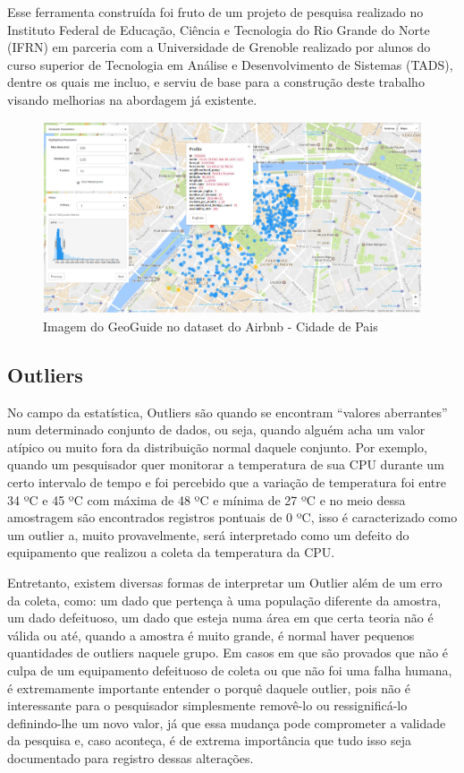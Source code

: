 Esse ferramenta construída foi fruto de um projeto de pesquisa realizado no Instituto Federal de Educação, Ciência e Tecnologia do Rio Grande do Norte (IFRN) em parceria com a Universidade de Grenoble realizado por alunos do curso superior de Tecnologia em Análise e Desenvolvimento de Sistemas (TADS), dentre os quais me incluo, e serviu de base para a construção deste trabalho visando melhorias na abordagem já existente.

\begin{figure}[t]
	\centering
	\includegraphics[width=\textwidth]{images/geoguide-example-airbnb}
	\caption{Imagem do GeoGuide no dataset do Airbnb - Cidade de Pais}
	\label{fig:geoguide-example-airbnb}
	\vspace{-10pt}
\end{figure}

\subsection{Outliers}

No campo da estatística, Outliers são quando se encontram ``valores aberrantes'' num determinado conjunto de dados, ou seja, quando alguém acha um valor atípico ou muito fora da distribuição normal daquele conjunto. Por exemplo, quando um pesquisador quer monitorar a temperatura de sua CPU durante um certo intervalo de tempo e foi percebido que a variação de temperatura foi entre 34 ºC e 45 ºC com máxima de 48 ºC e mínima de 27 ºC e no meio dessa amostragem são encontrados registros pontuais de 0 ºC, isso é caracterizado como um outlier a, muito provavelmente, será interpretado como um defeito do equipamento que realizou a coleta da temperatura da CPU.

Entretanto, existem diversas formas de interpretar um Outlier além de um erro da coleta, como: um dado que pertença à uma população diferente da amostra, um dado defeituoso, um dado que esteja numa área em que certa teoria não é válida ou até, quando a amostra é muito grande, é normal haver pequenos quantidades de outliers naquele grupo. Em casos em que são provados que não é culpa de um equipamento defeituoso de coleta ou que não foi uma falha humana, é extremamente importante entender o porquê daquele outlier, pois não é interessante para o pesquisador simplesmente removê-lo ou ressignificá-lo definindo-lhe um novo valor, já que essa mudança pode comprometer a validade da pesquisa e, caso aconteça, é de extrema importância que tudo isso seja documentado para registro dessas alterações.

